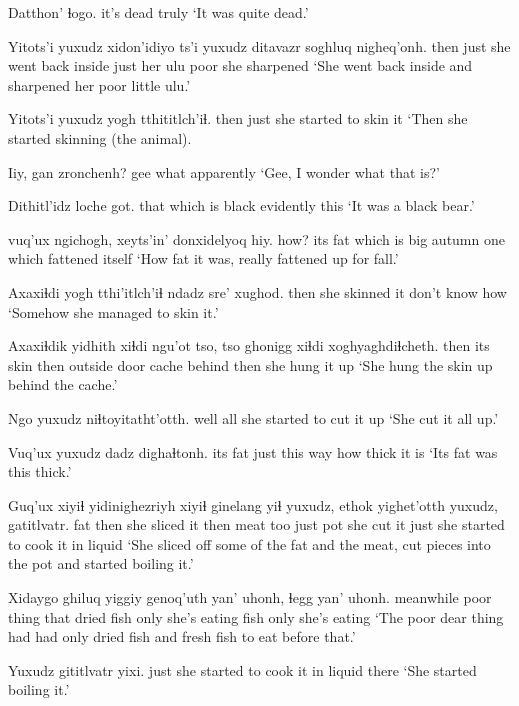 \documentclass[12pt]{article}
\begin{document}
\gll Datthon' ɬogo.
{it's dead} truly
\glt `It was quite dead.'
\glend

\gll Yitots'i yuxudz xidon'idiyo ts'i yuxudz ditavazr soghluq nigheq'onh.
then just {she went back inside} {} just {her ulu} poor {she sharpened}
\glt `She went back inside and sharpened her poor little ulu.'
\glend

\gll Yitots'i yuxudz {yogh tthititlch'iɬ.}
then just {she started to skin it}
\glt `Then she started skinning (the animal).
\glend

\gll Iiy, gan zronchenh?
gee what apparently
\glt `Gee, I wonder what that is?'
\glend

\gll Dithitl'idz loche got.
{that which is black} evidently this
\glt `It was a black bear.'
\glend

 vuq'ux ngichogh, xeyts'in' {donxidelyoq hiy.}
how? {its fat} {which is big} autumn {one which fattened itself}
\glt `How fat it was, really fattened up for fall.'
\glend

\gll Axaxiɬdi {yogh tthi'itlch'iɬ} {ndadz sre' xughod.}
then {she skinned it} {don't know how}
\glt `Somehow she managed to skin it.'
\glend

\gll Axaxiɬdik yidhith xiɬdi ngu'ot tso, tso ghonigg xiɬdi xoghyaghdiɬcheth.
then {its skin} then {outside door} cache {} behind then {she hung it up}
\glt `She hung the skin up behind the cache.'
\glend

\gll Ngo yuxudz niɬtoyitatht'otth. 
well all {she started to cut it up}
\glt `She cut it all up.'
\glend

\gll Vuq'ux yuxudz dadz dighaɬtonh.
{its fat} just {this way} {how thick it is}
\glt `Its fat was this thick.'
\glend

\gll Guq'ux xiyiɬ yidinighezriyh xiyiɬ ginelang yiɬ yuxudz, ethok yighet'otth yuxudz, gatitlvatr.
fat then {she sliced it} then meat too just pot {she cut it} just {she started to cook it in liquid} 
\glt `She sliced off some of the fat and the meat, cut pieces into the pot and started boiling it.'
\glend

\gll  Xidaygo ghiluq yiggiy genoq'uth yan' uhonh, ɬegg yan' uhonh.
meanwhile {poor thing} that {dried fish} only {she's eating} fish only {she's eating}
\glt `The poor dear thing had had only dried fish and fresh fish to eat before that.'
\glend

\gll Yuxudz gititlvatr yixi. 
just {she started to cook it in liquid} there 
\glt `She started boiling it.' 
\glend
\end{document}
